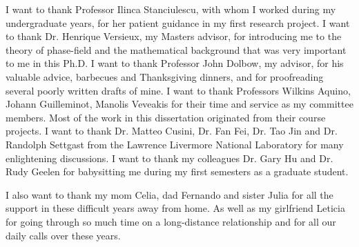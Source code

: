 \acknowledgements

I want to thank Professor Ilinca Stanciulescu, with whom I worked during my undergraduate years, for her patient guidance in my first research project. I want to thank Dr. Henrique Versieux, my Masters advisor, for introducing me to the theory of phase-field and the mathematical background that was very important to me in this Ph.D. I want to thank Professor John Dolbow, my advisor, for his valuable advice, barbecues and Thanksgiving dinners, and for proofreading several poorly written drafts of mine. I want to thank Professors Wilkins Aquino, Johann Guilleminot, Manolis Veveakis for their time and service as my committee members. Most of the work in this dissertation originated from their course projects. I want to thank Dr. Matteo Cusini, Dr. Fan Fei, Dr. Tao Jin and Dr. Randolph Settgast from the Lawrence Livermore National Laboratory for many enlightening discussions. I want to thank my colleagues Dr. Gary Hu and Dr. Rudy Geelen for babysitting me during my first semesters as a graduate student. 

I also want to thank my mom Celia, dad Fernando and sister Julia for all the support in these difficult years away from home. As well as my girlfriend Leticia for going through so much time on a long-distance relationship and for all our daily calls over these years.
